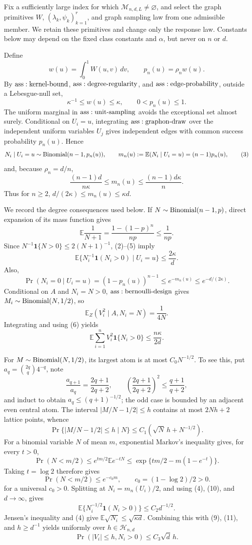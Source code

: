 Fix a sufficiently large index for which \(\mathcal M_{n,d,L}\ne\varnothing\), and select the graph primitives \(W\), \((\lambda_k,\psi_k)_{k=1}^r\), and graph sampling law from one admissible member.  We retain these primitives and change only the response law.  Constants below may depend on the fixed class constants and \(\alpha\), but never on \(n\) or \(d\).

Define
\[
 w(u)=\int_0^1W(u,v)\,dv,
 \qquad p_n(u)=\rho_nw(u).
\tag{1}
\]
By \({\rm ass:kernel\text{-}bound}\), \({\rm ass:degree\text{-}regularity}\), and \({\rm ass:edge\text{-}probability}\), outside a Lebesgue-null set,
\[
 \kappa^{-1}\leq w(u)\leq\kappa,
 \qquad 0<p_n(u)\leq1.
\tag{2}
\]
The uniform marginal in \({\rm ass:unit\text{-}sampling}\) avoids the exceptional set almost surely.  Conditional on \(U_i=u\), integrating \({\rm ass:graphon\text{-}draw}\) over the independent uniform variables \(U_j\) gives independent edges with common success probability \(p_n(u)\).  Hence
\[
 N_i\mid U_i=u\sim{\rm Binomial}(n-1,p_n(u)),
 \qquad m_n(u):=\mathbb E(N_i\mid U_i=u)=(n-1)p_n(u),
\tag{3}
\]
and, because \(\rho_n=d/n\),
\[
 \frac{(n-1)d}{n\kappa}\leq m_n(u)\leq\frac{(n-1)d\kappa}{n}.
\tag{4}
\]
Thus for \(n\geq2\), \(d/(2\kappa)\leq m_n(u)\leq\kappa d\).

We record the degree consequences used below.  If \(N\sim{\rm Binomial}(n-1,p)\), direct expansion of its mass function gives
\[
 \mathbb E\frac1{N+1}=\frac{1-(1-p)^n}{np}\leq\frac1{np}.
\tag{5}
\]
Since \(N^{-1}\mathbf1\{N>0\}\leq2(N+1)^{-1}\), (2)--(5) imply
\[
 \mathbb E\{N_i^{-1}\mathbf1(N_i>0)\mid U_i=u\}\leq\frac{2\kappa}{d}.
\tag{6}
\]
Also,
\[
 \Pr(N_i=0\mid U_i=u)=(1-p_n(u))^{n-1}
 \leq e^{-m_n(u)}\leq e^{-d/(2\kappa)}.
\tag{7}
\]
Conditional on \(A\) and \(N_i=N>0\), \({\rm ass:bernoulli\text{-}design}\) gives \(M_i\sim{\rm Binomial}(N,1/2)\), so
\[
 \mathbb E_Z(V_i^2\mid A,N_i=N)=\frac1{4N}.
\]
Integrating and using (6) yields
\[
 \mathbb E\sum_{i=1}^nV_i^2\mathbf1\{N_i>0\}\leq\frac{n\kappa}{2d}.
\tag{8}
\]

For \(M\sim{\rm Binomial}(N,1/2)\), its largest atom is at most \(C_0N^{-1/2}\).  To see this, put \(a_q={2q\choose q}4^{-q}\), note
\[
 \frac{a_{q+1}}{a_q}=\frac{2q+1}{2q+2},
 \qquad \left(\frac{2q+1}{2q+2}\right)^2\leq\frac{q+1}{q+2},
\]
and induct to obtain \(a_q\leq(q+1)^{-1/2}\); the odd case is bounded by an adjacent even central atom.  The interval \(|M/N-1/2|\leq h\) contains at most \(2Nh+2\) lattice points, whence
\[
 \Pr\{|M/N-1/2|\leq h\mid N\}
 \leq C_1(\sqrt N\,h+N^{-1/2}).
\tag{9}
\]
For a binomial variable \(N\) of mean \(m\), exponential Markov's inequality gives, for every \(t>0\),
\[
 \Pr(N<m/2)
 \leq e^{tm/2}\mathbb E e^{-tN}
 \leq\exp\{tm/2-m(1-e^{-t})\}.
\]
Taking \(t=\log2\) therefore gives
\[
 \Pr(N<m/2)\leq e^{-c_0m},
 \qquad c_0=(1-\log2)/2>0.
\tag{10}
\]
for a universal \(c_0>0\).  Splitting at \(N_i=m_n(U_i)/2\), and using (4), (10), and \(d\to\infty\), gives
\[
 \mathbb E\{N_i^{-1/2}\mathbf1(N_i>0)\}\leq C_2d^{-1/2}.
\tag{11}
\]
Jensen's inequality and (4) give \(\mathbb E\sqrt{N_i}\leq\sqrt{\kappa d}\).  Combining this with (9), (11), and \(h\geq d^{-1}\) yields uniformly over \(h\in\mathcal H_{n,d}\)
\[
 \Pr(|V_i|\leq h,N_i>0)\leq C_3\sqrt d\,h.
\tag{12}
\]

